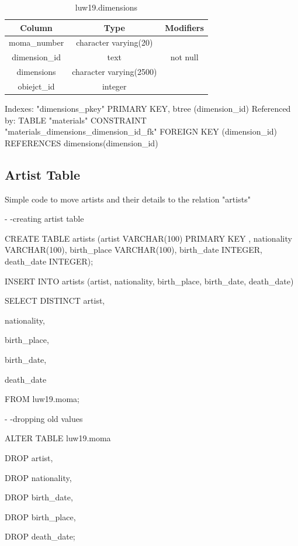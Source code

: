 \documentclass[journal,transmag]{IEEEtran}
\begin{document}
\begin{table}[]
\centering
\caption{luw19.dimensions}
\label{dimensions}
\begin{tabular}{c|c|c}
Column        & Type                    & Modifiers \\ \hline
moma\_number  & character varying(20)   &           \\
dimension\_id & text                    & not null  \\
dimensions    & character varying(2500) &           \\
obiejct\_id   & integer                 &          
\end{tabular}
\end{table}


Indexes:
    "dimensions\_pkey" PRIMARY KEY, btree (dimension\_id)
Referenced by:
    TABLE "materials" CONSTRAINT "materials\_dimensions\_dimension\_id\_fk" FOREIGN KEY (dimension\_id) REFERENCES dimensions(dimension\_id)
\newline


\subsection{Artist Table}

Simple code to move artists and their details to the relation "artists"
\newline

- -creating artist table


CREATE TABLE artists (artist VARCHAR(100) PRIMARY KEY , nationality VARCHAR(100), birth\_place VARCHAR(100), birth\_date INTEGER, death\_date INTEGER);

INSERT INTO artists (artist, nationality, birth\_place, birth\_date, death\_date)

    SELECT DISTINCT artist,

      nationality,

      birth\_place,

      birth\_date,

      death\_date

        FROM luw19.moma;


- -dropping old values

ALTER TABLE luw19.moma


  DROP artist,

  DROP nationality,

  DROP birth\_date,

  DROP birth\_place,

  DROP death\_date;
\newline
\end{document}
